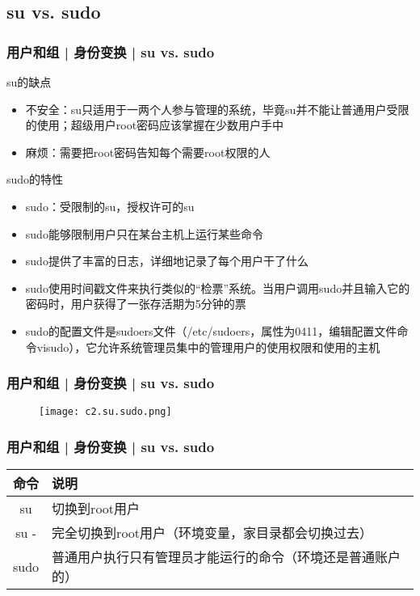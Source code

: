 \subsection{su vs. sudo}
\begin{frame}
  \frametitle{用户和组 | 身份变换 | su vs. sudo}
  \begin{block}{su的缺点}
    \begin{itemize}
      \item 不安全：su只适用于一两个人参与管理的系统，毕竟su并不能让普通用户受限的使用；超级用户root密码应该掌握在少数用户手中
      \item 麻烦：需要把root密码告知每个需要root权限的人
    \end{itemize}
  \end{block}
  \pause
  \begin{block}{sudo的特性}
    \begin{itemize}
      \item sudo：受限制的su，授权许可的su
      \item sudo能够限制用户只在某台主机上运行某些命令
      \item sudo提供了丰富的日志，详细地记录了每个用户干了什么
      \item sudo使用时间戳文件来执行类似的“检票”系统。当用户调用sudo并且输入它的密码时，用户获得了一张存活期为5分钟的票
      \item sudo的配置文件是sudoers文件（/etc/sudoers，属性为0411，编辑配置文件命令visudo），它允许系统管理员集中的管理用户的使用权限和使用的主机
    \end{itemize}
  \end{block}
\end{frame}

\begin{frame}
  \frametitle{用户和组 | 身份变换 | su vs. sudo}
  \begin{figure}
    \centering
    \texttt{[image: c2.su.sudo.png]}
  \end{figure}
\end{frame}

\begin{frame}
  \frametitle{用户和组 | 身份变换 | \alert{su vs. sudo}}
  \begin{table}
    \centering
    \begin{tabular}{cl}
      \hline
      \rowcolor{blue!50}命令 & 说明\\
      \hline
      su & 切换到root用户\\
      su - & 完全切换到root用户（环境变量，家目录都会切换过去）\\
      sudo & 普通用户执行只有管理员才能运行的命令（环境还是普通账户的）\\
      \hline
    \end{tabular}
  \end{table}
\end{frame}

